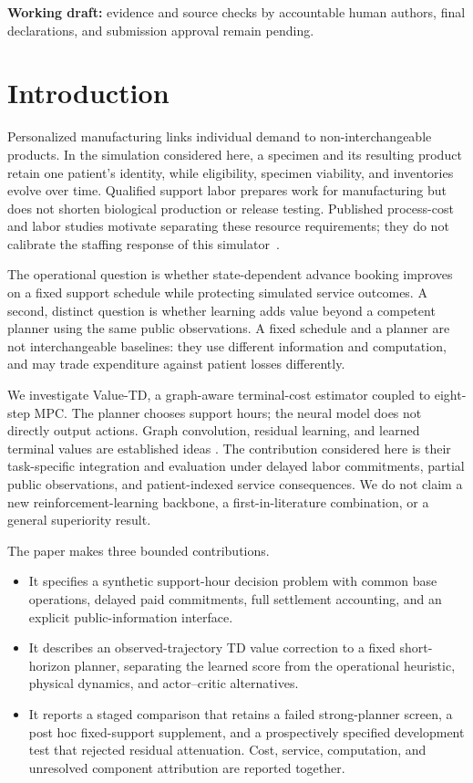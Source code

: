 \documentclass[preprint,review,12pt]{elsarticle}
\begin{document}
\begin{center}
\textbf{Working draft:} evidence and source checks by accountable human
authors, final declarations, and submission approval remain pending.
\end{center}

\section{Introduction}
\label{sec:introduction}
Personalized manufacturing links individual demand to non-interchangeable
products. In the simulation considered here, a specimen and its resulting
product retain one patient's identity, while eligibility, specimen viability,
and inventories evolve over time. Qualified support labor prepares work for
manufacturing but does not shorten biological production or release testing.
Published process-cost and labor studies motivate separating these resource
requirements; they do not calibrate the staffing response of this
simulator~\cite{Ran2020DecentralizedCART,Fitzgerald2022AutomatedASC}.

The operational question is whether state-dependent advance booking improves
on a fixed support schedule while protecting simulated service outcomes.
A second, distinct question is whether learning adds value beyond a competent
planner using the same public observations. A fixed schedule and a planner
are not interchangeable baselines: they use different information and
computation, and may trade expenditure against patient losses differently.

We investigate Value-TD, a graph-aware terminal-cost estimator coupled to
eight-step MPC. The planner chooses support hours; the neural model does
not directly output actions. Graph convolution, residual learning, and
learned terminal values are established ideas
\cite{Kipf2017GCN,Johannink2019ResidualRL,Hansen2022TDMPC}.
The contribution considered here is their task-specific integration and
evaluation under delayed labor commitments, partial public observations,
and patient-indexed service consequences. We do not claim a new
reinforcement-learning backbone, a first-in-literature combination, or a
general superiority result.

The paper makes three bounded contributions.
\begin{itemize}
\item It specifies a synthetic support-hour decision problem with common
base operations, delayed paid commitments, full settlement accounting,
and an explicit public-information interface.
\item It describes an observed-trajectory TD value correction to a fixed
short-horizon planner, separating the learned score from the operational
heuristic, physical dynamics, and actor--critic alternatives.
\item It reports a staged comparison that retains a failed strong-planner
screen, a post hoc fixed-support supplement, and a prospectively specified
development test that rejected residual attenuation. Cost, service,
computation, and unresolved component attribution are reported together.
\end{itemize}
\end{document}
